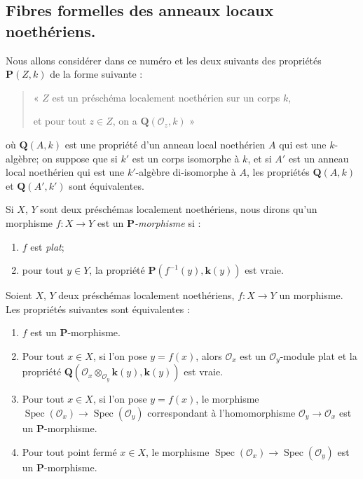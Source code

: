 \subsection{Fibres formelles des anneaux locaux noethériens.}
\label{subsection:IV.7.3-fr}

\begin{env}[7.3.1]
\label{IV.2.s7.3.1-fr}
Nous allons considérer dans ce numéro et les deux suivants des propriétés
$\boldsymbol P(Z,k)$ de la forme suivante :
\begin{quote}
« $Z$ est un préschéma localement noethérien sur un corps $k$,

et pour tout $z\in Z$, on a $\boldsymbol Q(\mathscr O_z,k)$ »
\end{quote}
où $\boldsymbol Q(A,k)$ est une propriété d'un anneau local noethérien $A$
qui est une $k$-algèbre; on suppose que si $k'$ est un corps isomorphe à
$k$, et si $A'$ est un anneau local noethérien qui est une $k'$-algèbre
di-isomorphe à $A$, les propriétés $\boldsymbol Q(A,k)$ et
$\boldsymbol Q(A',k')$ sont équivalentes.
\end{env}


Si $X$, $Y$ sont deux préschémas localement noethériens, nous dirons qu'un
morphisme $f:X\to Y$ est un \emph{$\boldsymbol P$-morphisme} si :
\begin{enumerate}
\item[1\textsuperscript{o}] $f$ est \emph{plat};
\item[2\textsuperscript{o}] pour tout $y\in Y$, la propriété
$\boldsymbol P(f^{-1}(y),\boldsymbol{k}(y))$ est vraie.
\end{enumerate}

\begin{lemma}[7.3.2]
\label{IV.2.s7.3.2-fr}
Soient $X$, $Y$ deux préschémas localement noethériens,
$f:X\to Y$ un morphisme. Les propriétés suivantes sont équivalentes :
\begin{enumerate}
\item[\emph{a)}] $f$ est un $\boldsymbol P$-morphisme.
\item[\emph{b)}] Pour tout $x\in X$, si l'on pose $y=f(x)$, alors $\mathscr O_x$ est
un $\mathscr O_y$-module plat et la propriété
$\boldsymbol Q(\mathscr O_x\otimes_{\mathscr O_y}\boldsymbol{k}(y),\boldsymbol{k}(y))$ est vraie.
\item[\emph{c)}] Pour tout $x\in X$, si l'on pose $y=f(x)$, le morphisme
$\operatorname{Spec}(\mathscr O_x)\to\operatorname{Spec}(\mathscr O_y)$
correspondant à l'homomorphisme $\mathscr O_y\to\mathscr O_x$ est un
$\boldsymbol P$-morphisme.
\item[\emph{c$'$)}] Pour tout point fermé $x\in X$, le morphisme
$\operatorname{Spec}(\mathscr O_x)\to\operatorname{Spec}(\mathscr O_y)$
est un $\boldsymbol P$-morphisme.
\end{enumerate}
\end{lemma}

